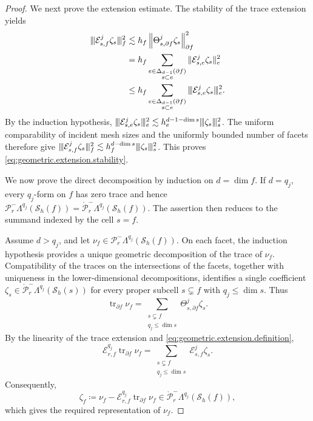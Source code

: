 \documentclass[a4paper,11pt]{article}
\theoremstyle{definition}
\newcommand{\Sh}{\mathcal{S}_h}
\newcommand{\FM}[1]{\Delta_{#1}}
\newcommand{\PLtrim}[2]{\mathcal{P}_{#1}^{-}\Lambda^{#2}}
\newcommand{\trc}{\operatorname{tr}}
\newcommand{\PLtrimz}[2]{\mathring{\mathcal P}_{#1}^{-}\Lambda^{#2}}
\newcommand{\vvvert}{\vert\kern-0.25ex\vert\kern-0.25ex\vert}
\begin{document}
\begin{proof}
We next prove the extension estimate.
The stability of the trace extension yields
\[
\begin{aligned}
\vvvert
  \mathcal E_{s,f}^j\zeta_s
  \vvvert_f^2
  &\lesssim
  h_f
  \left\|
    \Theta_{s,\partial f}^j\zeta_s
  \right\|_{\partial f}^2
  \\
  &=
  h_f
  \sum_{\substack{
    e\in\FM{d-1}(\partial f)\\
    s\subset e
  }}
  \|
    \mathcal E_{s,e}^j\zeta_s
  \|_e^2
  \\
  &\leq
  h_f
  \sum_{\substack{
    e\in\FM{d-1}(\partial f)\\
    s\subset e
  }}
  \vvvert
    \mathcal E_{s,e}^j\zeta_s
  \vvvert_e^2.
\end{aligned}
\]
By the induction hypothesis, $\vvvert \mathcal E_{s,e}^j\zeta_s \vvvert_e^2 \lesssim h_e^{d-1-\dim s} \vvvert\zeta_s\vvvert_s^2$.
The uniform comparability of incident mesh sizes and the uniformly bounded number of facets therefore give $\vvvert \mathcal E_{s,f}^j\zeta_s \vvvert_f^2 \lesssim h_f^{d-\dim s} \vvvert\zeta_s\vvvert_s^2$.
This proves \eqref{eq:geometric.extension.stability}.

We now prove the direct decomposition by induction on $d=\dim f$.
If $d=q_j$, every $q_j$-form on $f$ has zero trace and hence $\PLtrim{r}{q_j}(\Sh(f)) = \PLtrimz{r}{q_j}(\Sh(f))$.
The assertion then reduces to the summand indexed by the cell $s=f$.

Assume $d>q_j$, and let $\nu_f\in\PLtrim{r}{q_j}(\Sh(f))$.
On each facet, the induction hypothesis provides a unique geometric decomposition of the trace of $\nu_f$.
Compatibility of the traces on the intersections of the facets, together with uniqueness in the lower-dimensional decompositions, identifies a single coefficient $\zeta_s\in\PLtrimz{r}{q_j}(\Sh(s))$ for every proper subcell $s\subsetneq f$ with $q_j\leq\dim s$.
Thus
\[
\trc_{\partial f}\nu_f
=\sum_{\substack{
  s\subsetneq f\\
    q_j\leq\dim s
  }}
  \Theta_{s,\partial f}^j\zeta_s.
\]
By the linearity of the trace extension and \eqref{eq:geometric.extension.definition},
\[
  \mathcal E_{r,f}^{q_j}
  \trc_{\partial f}\nu_f
  =
  \sum_{\substack{
    s\subsetneq f\\
    q_j\leq\dim s
  }}
  \mathcal E_{s,f}^j\zeta_s.
\]
Consequently,
\begin{equation}\label{eq:proper.cell.coefficient}
  \zeta_f
  \coloneqq
  \nu_f
  -
  \mathcal E_{r,f}^{q_j}
  \trc_{\partial f}\nu_f
  \in
  \PLtrimz{r}{q_j}(\Sh(f)),
\end{equation}
which gives the required representation of $\nu_f$.


\end{proof}
\end{document}
